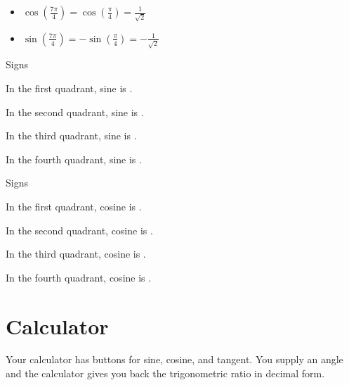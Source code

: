 \documentclass{ximera}
\begin{document}
\begin{itemize}
\item $\cos\left( \frac{7 \pi}{4} \right) = \cos\left( \frac{\pi}{4} \right) = \frac{1}{\sqrt{2}}$
\item $\sin\left( \frac{7 \pi}{4} \right) = -\sin\left( \frac{\pi}{4} \right) = -\frac{1}{\sqrt{2}}$
\end{itemize}








\begin{question} Signs 

In the first quadrant, sine is . 

In the second quadrant, sine is . 

In the third quadrant, sine is . 

In the fourth quadrant, sine is . 

\end{question}








\begin{question} Signs 

In the first quadrant, cosine is . 

In the second quadrant, cosine is . 

In the third quadrant, cosine is . 

In the fourth quadrant, cosine is . 

\end{question}











\section*{Calculator}

Your calculator has buttons for sine, cosine, and tangent. You supply an angle and the calculator gives you back the trigonometric ratio in decimal form.
\end{document}
